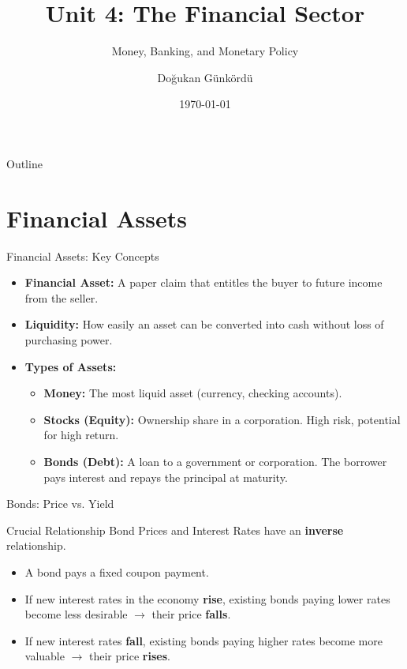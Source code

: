 \documentclass[aspectratio=169]{beamer}
\title{Unit 4: The Financial Sector}
\subtitle{Money, Banking, and Monetary Policy}
\author{Doğukan Günkördü}
\date{\today}
\begin{document}
\begin{frame}
    \titlepage
\end{frame}

\begin{frame}{Outline}
    \tableofcontents
\end{frame}

\section{Financial Assets}

\begin{frame}{Financial Assets: Key Concepts}
    \begin{itemize}
        \item \textbf{Financial Asset:} A paper claim that entitles the buyer to future income from the seller.
        \item \textbf{Liquidity:} How easily an asset can be converted into cash without loss of purchasing power.
        \item \textbf{Types of Assets:}
        \begin{itemize}
            \item \textbf{Money:} The most liquid asset (currency, checking accounts).
            \item \textbf{Stocks (Equity):} Ownership share in a corporation. High risk, potential for high return.
            \item \textbf{Bonds (Debt):} A loan to a government or corporation. The borrower pays interest and repays the principal at maturity.
        \end{itemize}
    \end{itemize}
\end{frame}

\begin{frame}{Bonds: Price vs. Yield}
    \begin{alertblock}{Crucial Relationship}
        Bond Prices and Interest Rates have an \textbf{inverse} relationship.
    \end{alertblock}
    
    \vspace{0.5cm}
    \begin{itemize}
        \item A bond pays a fixed coupon payment.
        \item If new interest rates in the economy \textbf{rise}, existing bonds paying lower rates become less desirable $\rightarrow$ their price \textbf{falls}.
        \item If new interest rates \textbf{fall}, existing bonds paying higher rates become more valuable $\rightarrow$ their price \textbf{rises}.
    \end{itemize}
\end{frame}
\end{document}
